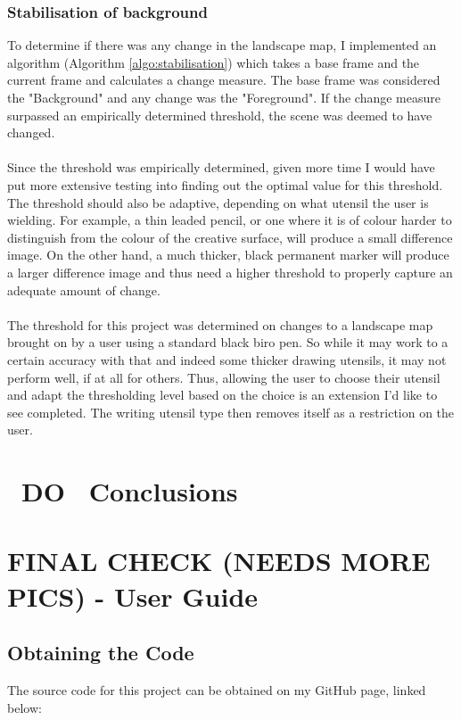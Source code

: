 \documentclass[11pt]{article}
\begin{document}
\subsubsection{Stabilisation of background}
To determine if there was any change in the landscape map, I implemented an
algorithm (Algorithm \ref{algo:stabilisation}) which takes a base frame 
and the current frame and calculates a change measure. The base 
frame was considered the "Background" and any change was the
"Foreground". If the change measure surpassed an empirically determined 
threshold, the scene was deemed to have changed.\\
\\
Since the threshold was empirically determined, given more time I would
have put more extensive testing into finding out the optimal value for 
this threshold. The threshold should also be adaptive, depending on what
utensil the user is wielding. For example, a thin leaded pencil, or one where
it is of colour harder to distinguish from the colour of the creative 
surface, will produce a small difference image. On the other hand, a 
much thicker, black permanent marker will produce a larger difference image and
thus need a higher threshold to properly capture an adequate amount of 
change.\\
\\
The threshold for this project was determined on changes to a landscape
map brought on by a user using a standard black biro pen. So while it
may work to a certain accuracy with that and indeed some thicker 
drawing utensils, it may not perform well, if at all for others. Thus,
allowing the user to choose their utensil and adapt the thresholding 
level based on the choice is an extension I'd like to see completed. The
writing utensil type then removes itself as a restriction on the user.

\section{~DO~ Conclusions}

\newpage
\section{FINAL CHECK (NEEDS MORE PICS) - User Guide}
\label{chapter:userguide}
\newpage
\subsection{Obtaining the Code}
\label{guide:obtainingcode}
The source code for this project can be obtained on my GitHub page, linked 
below:
\end{document}
